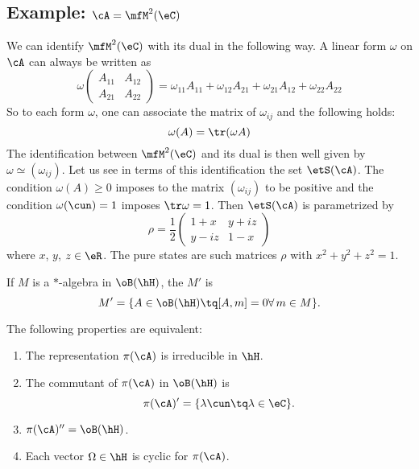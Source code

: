 \subsection*{Example: \texorpdfstring{$\cA=\mfM^2(\eC)$}{A=M2C}}
We can identify $\mfM^2(\eC)$ with its dual in the following way. A linear form $\omega$ on $\cA$ can always be written as
\[
  \omega
\begin{pmatrix}
 A_{11}&A_{12}\\
A_{21}&A_{22}
\end{pmatrix}
=\omega_{11}A_{11} +\omega_{12}A_{21}+ \omega_{21}A_{12}+ \omega_{22}A_{22}
\]
So to each form $\omega$, one can associate the matrix of $\omega_{ij}$ and the following holds:
\[
  \omega(A)=\tr(\omega A)
\]
The identification between $\mfM^2(\eC)$ and its dual is then well given by $\omega\simeq(\omega_{ij})$. Let us see in terms of this identification the set $\etS(\cA)$. The condition $\omega(A)\geq 0$ imposes to the matrix $(\omega_{ij})$ to be positive and the condition $\omega(\cun)=1$ imposes $\tr\omega=1$. Then $\etS(\cA)$ is parametrized by
\[
  \rho=\frac{ 1 }{2}
\begin{pmatrix}
1+x&y+iz\\
y-iz&1-x
\end{pmatrix}
\]
where $x$, $y$, $z\in\eR$. The pure states are such matrices $\rho$ with $x^2+y^2+z^2=1$.

If $M$ is a $*$-algebra in $\oB(\hH)$, the  $M'$ is
\[
  M'=\{ A\in\oB(\hH)\tq [A,m]=0    \forall\, m\in M \}.
\]

\begin{proposition}
The following properties are equivalent:

\begin{enumerate}
 \item \label{enumgz} The representation $\pi(\cA)$ is irreducible in $\hH$.
\item\label{enumgi} The commutant of $\pi(\cA)$ in $\oB(\hH)$ is
\[
  \pi(\cA)'=\{ \lambda\cun\tq\lambda\in\eC \}.
\]
\item \label{enumgii} $\pi(\cA)''=\oB(\hH)$.

\item \label{enumgiii} Each vector $\Omega\in\hH$ is cyclic for $\pi(\cA)$.

\end{enumerate}
 \label{prop_equiv_rep_irred}
\end{proposition}

